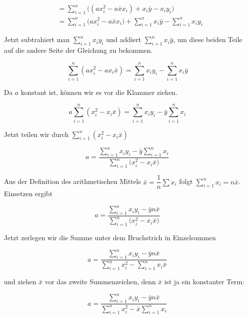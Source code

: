 \documentclass[ngerman, 12pt,parskip=half]{scrartcl}
\def\sm{\sum\limits_{i=1}^{n}}
\begin{document}
\begin{align}
     &= \sm \big( (ax_i^2 - a\bar{x}x_i) + x_i\bar{y} - x_iy_i \big) \\
     &= \sm \big( ax_i^2 - a\bar{x}x_i \big) + \sm x_i\bar{y} - \sm x_iy_i 
\end{align}

Jetzt subtrahiert man \(\sm x_iy_i\) und addiert \(\sm x_i\bar{y}\), um diese beiden Teile auf die andere Seite der Gleichung zu bekommen. %

\begin{equation}
\sm \left(ax_i^2 -ax_i\bar{x}\right) = \sm x_iy_i - \sm x_i\bar{y} 
\end{equation}

Da \(a\) konstant ist, können wir es vor die Klammer ziehen.

\begin{equation}
a \sm (x_i^2 -x_i\bar{x}) = \sm x_iy_i - \bar{y} \sm x_i 
\end{equation}

Jetzt teilen wir durch \(\sm \left(x_i^2 -x_i\bar{x}\right)\)



\begin{equation}
a =  \dfrac{\sm x_iy_i - \bar{y} \sm x_i}{\sm \big(x_i^2 -x_i\bar{x}\big)} 
\end{equation}

Aus der Definition des arithmetischen Mittels $\bar{x} = \dfrac{1}{n}\sum x_i$ folgt $\sm x_i= n\bar{x}$. Einsetzen ergibt 

\begin{equation}
a =  \dfrac{\sm x_iy_i - \bar{y} n \bar{x}}{ \sm \big( x_i^2 -  x_i \bar{x} \big)}
\end{equation}


Jetzt zerlegen wir die Summe unter dem Bruchstrich in Einzelsummen

\begin{equation}
a =  \dfrac{\sm x_iy_i - \bar{y} n\bar{x}}{\sm x_i^2 - \sm x_i \bar{x}}
\end{equation}

und ziehen \(\bar{x}\) vor das zweite Summenzeichen, denn \(\bar{x}\) ist ja ein konstanter Term:

\begin{equation}
a =  \dfrac{\sm x_iy_i - \bar{y} n\bar{x}}{\sm x_i^2 - \bar{x} \sm x_i}
\end{equation}
\end{document}
